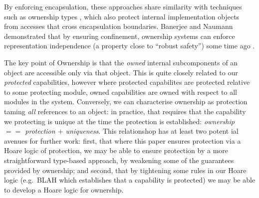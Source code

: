 By enforcing encapsulation,  %
these approaches share similarity with techniques such as
ownership types \cite{ownalias,NobPotVitECOOP98}, which also
protect internal implementation objects from accesses that cross
encapsulation boundaries.  Banerjee and Naumann demonstrated that by
ensuring confinement, ownership
systems can enforce representation independence (a property close to
``robust safety'') some time ago \cite{Banerjee:2005}.


The key point of Ownership is that the \textit{owned} internal
subcomponents of an object are accessible only via that object.
This
is quite closely related to our \textit{protected} capabilities,
however where protected capabilites are protected relative to some
protecting module, owned capabilities are owned with respect to all
modules in the system.  Conversely, we can characterise ownership as
protection taming \textit{all} references to an object: in practice,
that requires that the capability we protecting is unique at the time
the protection is established: \textit{ownership $==$ protection $+$
  uniqueness}.  This relationshop has at least two potent ial avenues
for further work: first, that where this paper ensures protection via
a Hoare logic of protection, we may be able to ensure protection by a
more straightforward type-based approach, by weakening some of the
guarantees provided by ownership; and second, that by tightening some
rules in our Hoare logic (e.g.\ BLAH which establishes that a
capability is protected) we may be able to develop a Hoare logic for
ownership.







